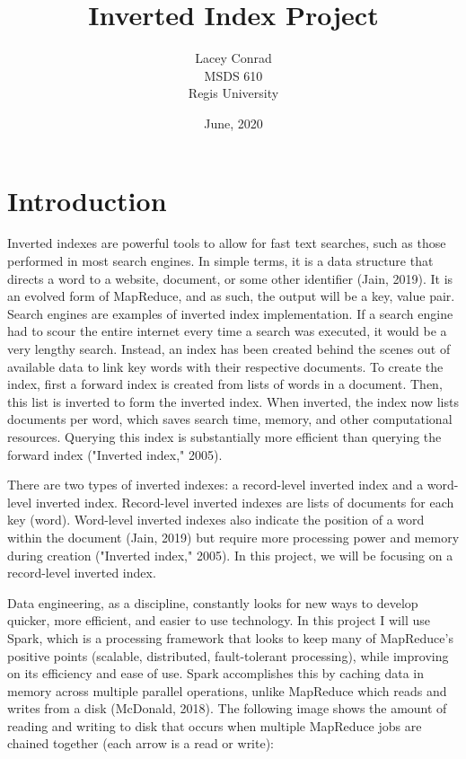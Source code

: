 \documentclass[]{article}
\title{Inverted Index Project}
\author{Lacey Conrad\\MSDS 610\\ Regis University}
\date{June, 2020}
\begin{document}
	\maketitle
	
\section{Introduction}
Inverted indexes are powerful tools to allow for fast text searches, such as those performed in most search engines.  In simple terms, it is a data structure that directs a word to a website, document, or some other identifier (Jain, 2019).  It is an evolved form of MapReduce, and as such, the output will be a key, value pair.  Search engines are examples of inverted index implementation.  If a search engine had to scour the entire internet every time a search was executed, it would be a very lengthy search.  Instead, an index has been created behind the scenes out of available data to link key words with their respective documents.  To create the index, first a forward index is created from lists of words in a document.  Then, this list is inverted to form the inverted index.  When inverted, the index now lists documents per word, which saves search time, memory, and other computational resources.  Querying this index is substantially more efficient than querying the forward index ("Inverted index," 2005).    

There are two types of inverted indexes: a record-level inverted index and a word-level inverted index.  Record-level inverted indexes are lists of documents for each key (word).  Word-level inverted indexes also indicate the position of a word within the document (Jain, 2019) but require more processing power and memory during creation ("Inverted index," 2005).  In this project, we will be focusing on a record-level inverted index. 

Data engineering, as a discipline, constantly looks for new ways to develop quicker, more efficient, and easier to use technology.  In this project I will use Spark, which is a processing framework that looks to keep many of MapReduce's positive points (scalable, distributed, fault-tolerant processing), while improving on its efficiency and ease of use.  Spark accomplishes this by caching data in memory across multiple parallel operations, unlike MapReduce which reads and writes from a disk (McDonald, 2018).  The following image shows the amount of reading and writing to disk that occurs when multiple MapReduce jobs are chained together (each arrow is a read or write):
\pagebreak
\end{document}
